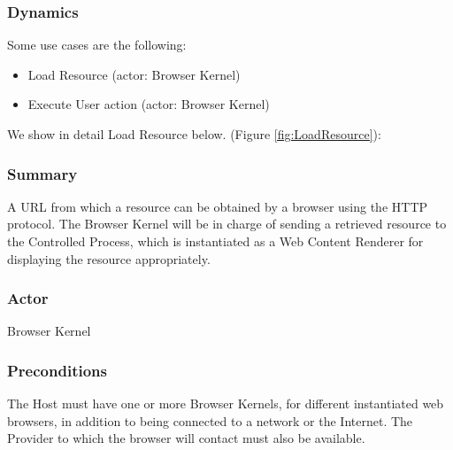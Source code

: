 \documentclass[prodmode,acmtecs]{acmsmall}
\begin{document}
    \subsubsection*{Dynamics}
    Some use cases are the following:
    \begin{itemize}\leftskip2.5em
      \item Load Resource (actor: Browser Kernel)

      \item Execute User action (actor: Browser Kernel)

    \end{itemize}
    We show in detail Load Resource below. (Figure \ref{fig:LoadResource}):
    \subsubsection*{Summary} A URL from which a resource can be obtained by a browser using the HTTP protocol. The Browser Kernel will be in charge of sending a retrieved resource to the Controlled Process, which is instantiated as a Web Content Renderer for displaying the resource appropriately.
    \subsubsection*{Actor} Browser Kernel
    \subsubsection*{Preconditions} The Host must have one or more Browser Kernels, for different instantiated web browsers, in addition to being connected to a network or the Internet. The Provider to which the browser will contact must also be available. 
\end{document}
